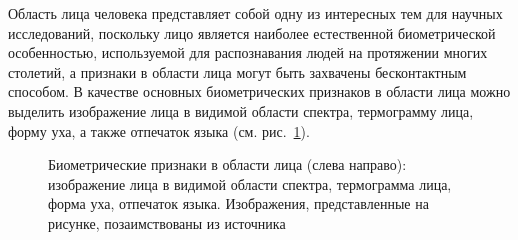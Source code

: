 \documentclass[12pt]{book}
\begin{document}
\large{Область лица человека представляет собой одну из интересных тем для научных исследований, поскольку лицо является наиболее естественной биометрической особенностью, используемой для распознавания людей на протяжении многих столетий, а признаки в области лица могут быть захвачены бесконтактным способом. В качестве основных биометрических признаков в области лица можно выделить изображение лица в видимой области спектра, термограмму лица, форму уха, а также отпечаток языка (см. рис.~\ref{fig:figure_1_3}).}

\begin{figure}[]
\caption{Биометрические признаки в области лица (слева направо): изображение лица в видимой области спектра, термограмма лица, форма уха, отпечаток языка. Изображения, представленные на рисунке, позаимствованы из источника \cite{unar_2014}}
\label{fig:figure_1_3}
\end{figure}
\end{document}
